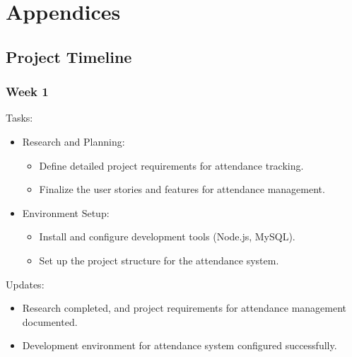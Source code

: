 \documentclass[a4paper, 12pt]{article}
\begin{document}
\newpage
\section{Appendices}
\subsection{Project Timeline}
\subsubsection{Week 1}
Tasks:
\begin{itemize}
    \item Research and Planning:
    \begin{itemize}
        \item Define detailed project requirements for attendance tracking.
        \item Finalize the user stories and features for attendance management.
    \end{itemize}
    \item Environment Setup:
    \begin{itemize}
        \item Install and configure development tools (Node.js, MySQL).
        \item Set up the project structure for the attendance system.
    \end{itemize}
\end{itemize}
Updates:
\begin{itemize}
    \item Research completed, and project requirements for attendance management documented.
    \item Development environment for attendance system configured successfully.
\end{itemize}
\end{document}
